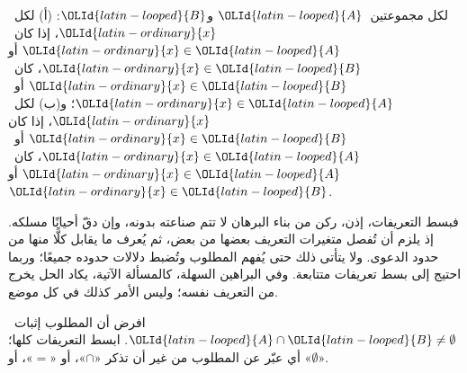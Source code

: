 \documentclass[../../../include/open-logic-section]{subfiles}
\begin{document}
\begin{prop}
لكل مجموعتين~$\OLId{latin-looped}{A}$ و$\OLId{latin-looped}{B}$: (أ) لكل~$\OLId{latin-ordinary}{x}$، إذا كان~$\OLId{latin-ordinary}{x} \in \OLId{latin-looped}{A}$ أو
$\OLId{latin-ordinary}{x} \in \OLId{latin-looped}{B}$، كان~$\OLId{latin-ordinary}{x} \in \OLId{latin-looped}{B}$ أو~$\OLId{latin-ordinary}{x} \in \OLId{latin-looped}{A}$؛ و(ب) لكل~$\OLId{latin-ordinary}{x}$، إذا كان
$\OLId{latin-ordinary}{x} \in \OLId{latin-looped}{B}$ أو~$\OLId{latin-ordinary}{x} \in \OLId{latin-looped}{A}$، كان~$\OLId{latin-ordinary}{x} \in \OLId{latin-looped}{A}$ أو~$\OLId{latin-ordinary}{x} \in \OLId{latin-looped}{B}$.
\end{prop}

فبسط التعريفات، إذن، ركن من بناء البرهان لا تتم صناعته بدونه، وإن
دقّ أحيانًا مسلكه. إذ يلزم أن تُفصل متغيرات التعريف بعضها من بعض، ثم
يُعرف ما يقابل كلًّا منها من حدود الدعوى. ولا يتأتى ذلك حتى يُفهم
المطلوب وتُضبط دلالات حدوده جميعًا؛ وربما احتيج إلى بسط تعريفات
متتابعة. وفي البراهين السهلة، كالمسألة الآتية، يكاد الحل يخرج من
التعريف نفسه؛ وليس الأمر كذلك في كل موضع.

\begin{prob}
افرض أن المطلوب إثبات~$\OLId{latin-looped}{A} \cap \OLId{latin-looped}{B} \neq \emptyset$. ابسط التعريفات كلها؛
أي عبّر عن المطلوب من غير أن تذكر «$\cap$»، أو «$=$»، أو
«$\emptyset$».
\end{prob}
\end{document}
